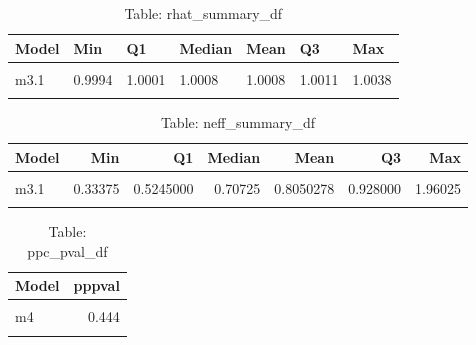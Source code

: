 \begin{table}
\centering
\caption{Table:  rhat_summary_df}
\centering
\fontsize{10}{12}\selectfont
\begin{tabular}[t]{lllllll}
\toprule
Model & Min & Q1 & Median & Mean & Q3 & Max\\
\midrule
\cellcolor{gray!10}{m2} & \cellcolor{gray!10}{0.9994} & \cellcolor{gray!10}{0.9998} & \cellcolor{gray!10}{1.0004} & \cellcolor{gray!10}{1.0006} & \cellcolor{gray!10}{1.0016} & \cellcolor{gray!10}{1.0027}\\
m3.1 & 0.9994 & 1.0001 & 1.0008 & 1.0008 & 1.0011 & 1.0038\\
\cellcolor{gray!10}{m4} & \cellcolor{gray!10}{0.9992} & \cellcolor{gray!10}{0.9996} & \cellcolor{gray!10}{1.0003} & \cellcolor{gray!10}{1.0005} & \cellcolor{gray!10}{1.0013} & \cellcolor{gray!10}{1.0031}\\
\bottomrule
\end{tabular}
\end{table}

\begin{table}
\centering
\caption{Table:  neff_summary_df}
\centering
\fontsize{10}{12}\selectfont
\begin{tabular}[t]{lrrrrrr}
\toprule
Model & Min & Q1 & Median & Mean & Q3 & Max\\
\midrule
\cellcolor{gray!10}{m2} & \cellcolor{gray!10}{0.22925} & \cellcolor{gray!10}{0.4194375} & \cellcolor{gray!10}{0.70750} & \cellcolor{gray!10}{0.7568971} & \cellcolor{gray!10}{0.905375} & \cellcolor{gray!10}{1.56500}\\
m3.1 & 0.33375 & 0.5245000 & 0.70725 & 0.8050278 & 0.928000 & 1.96025\\
\cellcolor{gray!10}{m4} & \cellcolor{gray!10}{0.33600} & \cellcolor{gray!10}{0.3902500} & \cellcolor{gray!10}{0.62150} & \cellcolor{gray!10}{0.7500663} & \cellcolor{gray!10}{0.916000} & \cellcolor{gray!10}{1.95175}\\
\bottomrule
\end{tabular}
\end{table}

\begin{table}
\centering
\caption{Table:  ppc_pval_df}
\centering
\fontsize{10}{12}\selectfont
\begin{tabular}[t]{lr}
\toprule
Model & pppval\\
\midrule
\cellcolor{gray!10}{m3.1} & \cellcolor{gray!10}{0.476}\\
m4 & 0.444\\
\cellcolor{gray!10}{m2} & \cellcolor{gray!10}{0.452}\\
\bottomrule
\end{tabular}
\end{table}

